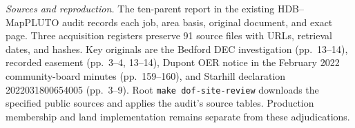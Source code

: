\textit{Sources and reproduction.} The ten-parent report in the existing
HDB--MapPLUTO audit records each job, area basis, original document, and exact
page. Three acquisition registers preserve 91 source files with URLs, retrieval
dates, and hashes. Key originals are the Bedford DEC investigation (pp.~13--14),
recorded easement (pp.~3--4, 13--14), Dupont OER notice in the February 2022
community-board minutes (pp.~159--160), and Starhill declaration
2022031800654005 (pp.~3--9). Root \texttt{make dof-site-review} downloads the
specified public sources and applies the audit's source tables. Production
membership and land implementation remains separate from these adjudications.
